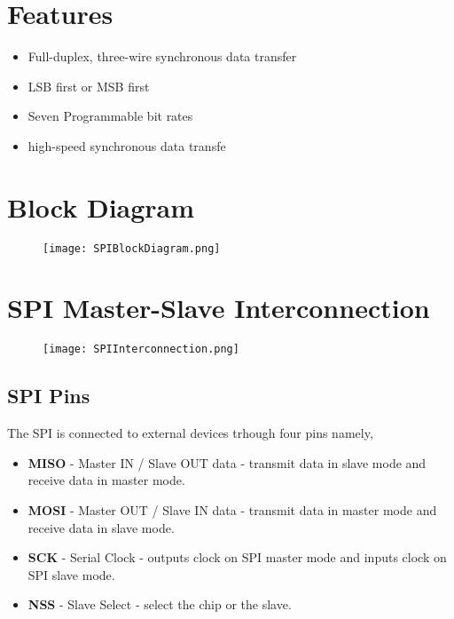 


% 

\section{Features}
\begin{itemize}
    \item Full-duplex, three-wire synchronous data transfer
    \item LSB first or MSB first
    \item Seven Programmable bit rates
    \item high-speed synchronous data transfe
\end{itemize}

\section{Block Diagram}
\begin{figure}[H]
    \centering
    \texttt{[image: SPIBlockDiagram.png]}
\end{figure}

\section{SPI Master-Slave Interconnection}
\begin{figure}[H]
    \centering
    \texttt{[image: SPIInterconnection.png]}
\end{figure}
\subsection{SPI Pins}
\quad The SPI is connected to external devices trhough four pins namely,
\begin{itemize}
	\item \textbf{MISO} - Master IN / Slave OUT data - transmit data in slave mode and receive data in master mode.
	\item \textbf{MOSI} - Master OUT / Slave IN data - transmit data in master mode and receive data in slave mode.
	\item \textbf{SCK} - Serial Clock - outputs clock on SPI master mode and inputs clock on SPI slave mode.
	\item \textbf{NSS} - Slave Select - select the chip or the slave.
\end{itemize}

